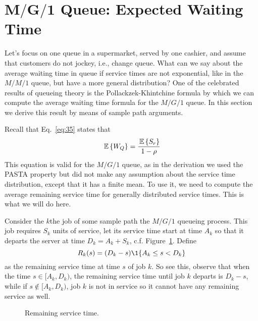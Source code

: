 \section
[$M/G/1$ Queue: Expected Waiting Time]
{$\mathbf{M/G/1}$ Queue: Expected Waiting Time}
\label{sec:mg1}

Let's focus on one queue in a supermarket, served by one cashier, and
assume that customers do not jockey, i.e., change queue. What can we
say about the average waiting time in queue if service times are not
exponential, like in the $M/M/1$ queue, but have a more general
distribution? One of the celebrated results of queueing theory is the
Pollackzek-Khintchine formula by which we can compute the average
waiting time formula for the $M/G/1$ queue. In this section we derive
this result by means of sample path arguments.

Recall that Eq.~\eqref{eq:35} states that
\begin{equation*}
  \,\mathbb{E}\left\{W_Q\right\} = \frac{\,\mathbb{E}\left\{S_r\right\}}{1-\rho}
\end{equation*}
This equation is valid for the $M/G/1$ queue, as in the derivation we
used the PASTA property but did not make any assumption about the
service time distribution, except that it has a finite mean. To use
it, we need to compute the average remaining service time for
generally distributed service times. This is what we will do here.

Consider the $k$the job of some sample path the $M/G/1$ queueing
process. This job requires $S_k$ units of service, let its service
time start at time $A_k$ so that it departs the server at time
$D_k=A_k + S_k$, c.f. Figure~\ref{fig:mg1remainingservicetime}. Define
\begin{equation*}
R_k(s) = (D_k-s)\1{A_k \leq s < D_k}
\end{equation*}
as the remaining service time at time $s$ of job $k$. So see this,
observe that when the time $s\in [A_k, D_k)$, the remaining service
time until job $k$ departs is $D_k-s $, while if
$s\not \in [A_k, D_k)$, job $k$ is not in service so it cannot have
any remaining service as well.

\begin{figure}[ht]
  \centering
{}

  \caption{Remaining service time.}
  \label{fig:mg1remainingservicetime}
\end{figure}


